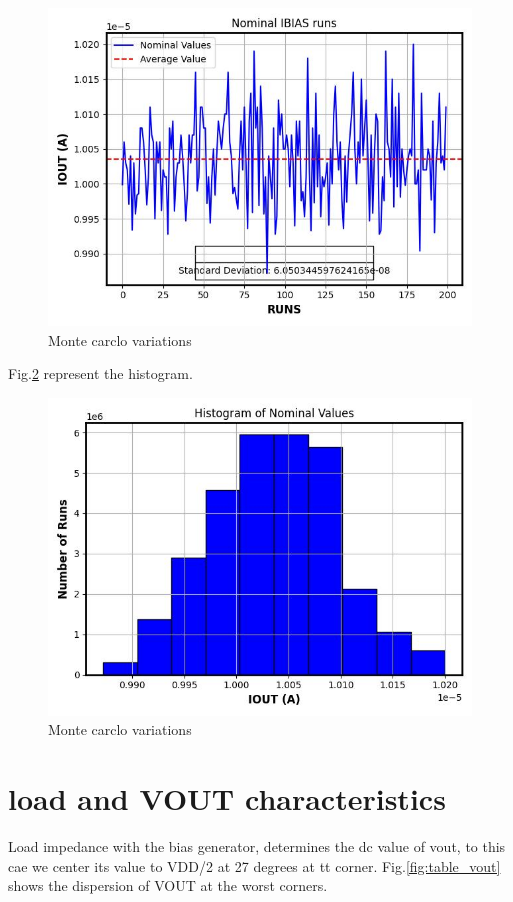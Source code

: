 \documentclass{article}
\begin{document}
\begin{figure}[H] %
    \centering
    \includegraphics[width=.7\textwidth]{./Nominal_IBIAS_runs.jpg} %
    \caption{Monte carclo variations}
    \label{fig:nominal}
\end{figure}


Fig.\ref{fig:histogram} represent the histogram.

\begin{figure}[H] %
    \centering
    \includegraphics[width=.7\textwidth]{./Nominal_IBIAS_runs_histogram.jpg} %
    \caption{Monte carclo variations}
    \label{fig:histogram}
\end{figure}


\section{load and VOUT characteristics}
Load impedance with the bias generator, determines the dc value of vout, to this cae we center its value to VDD/2 at 27 degrees at tt corner. Fig.\ref{fig:table_vout} shows the dispersion of VOUT at the worst corners.
\end{document}
